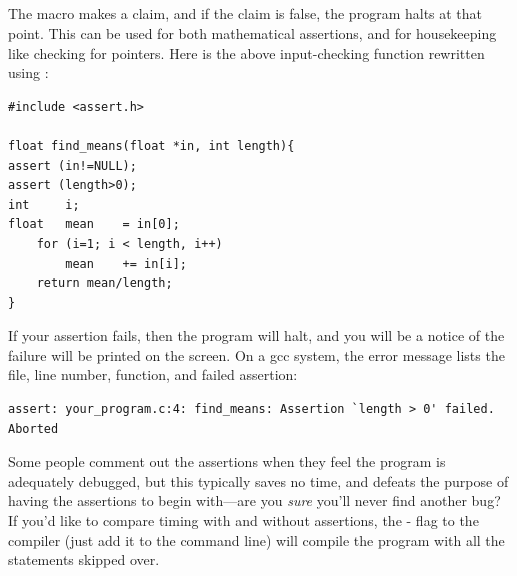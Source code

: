 \documentclass[12pt]{article}
\makeatletter
\def\cindex#1{\index{#1@\ci{#1}}}
\makeatother
\begin{document}
\subsection{} \cindex{assert}
The  macro makes a claim, and if the claim is false, the
program halts at that point. This can be used for both mathematical
assertions, and for housekeeping like checking for 
pointers. Here is the above input-checking function rewritten using
:
\begin{lstlisting}
#include <assert.h>

float find_means(float *in, int length){
assert (in!=NULL);
assert (length>0);
int     i;
float   mean    = in[0];
    for (i=1; i < length, i++)
        mean    += in[i];
    return mean/length;
}
\end{lstlisting}

If your assertion fails, then the program will halt, and you will be
a notice of the failure will be printed on the screen. On a gcc system,
the error message lists the file, line number, function, and failed assertion:
\begin{lstlisting}
assert: your_program.c:4: find_means: Assertion `length > 0' failed.
Aborted
\end{lstlisting}

Some people comment out the assertions when they feel the program is
adequately debugged, but this typically saves no time, and defeats the
purpose of having the assertions to begin with---are you {\em sure}
you'll never find another bug? If you'd like to compare timing with and
without assertions, the - flag to the compiler (just
add it to the command line) will compile the program with all the
 statements skipped over.

\end{document}
